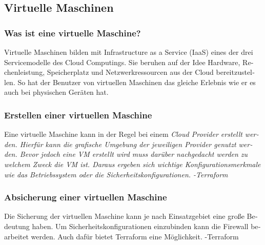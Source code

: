 
\begin{otherlanguage}{ngerman}
\subsection{Virtuelle Maschinen}
\subsubsection{Was ist eine virtuelle Maschine?}
Virtuelle Maschinen bilden mit Infrastructure as a Service (IaaS) eines der drei Servicemodelle des Cloud Computings. Sie beruhen auf der Idee Hardware, Rechenleistung, Speicherplatz und Netzwerkressourcen aus der Cloud bereitzustellen. So hat der Benutzer von virtuellen Maschinen das gleiche Erlebnis wie er es auch bei physischen Geräten hat. 
\newline 


\subsubsection{Erstellen einer virtuellen Maschine}
Eine virtuelle Maschine kann in der Regel bei einem \it Cloud Provider \rm erstellt werden. Hierfür kann die grafische Umgebung der jeweiligen Provider genutzt werden. Bevor jedoch eine VM erstellt wird muss darüber nachgedacht werden zu welchem Zweck die VM ist. Daraus ergeben sich wichtige Konfigurationsmerkmale wie das Betriebssystem oder die Sicherheitskonfigurationen. 
\newline
-Terraform

\subsubsection{Absicherung einer virtuellen Maschine}
Die Sicherung der virtuellen Maschine kann je nach Einsatzgebiet eine große Bedeutung haben. Um Sicherheitskonfigurationen einzubinden kann die Firewall bearbeitet werden. Auch dafür bietet Terraform eine Möglichkeit. 
\newline 
-Terraform
\end{otherlanguage}